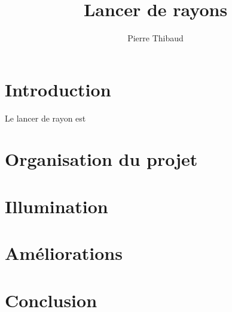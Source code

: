 \documentclass[10pt,a4paper]{article}
\author{Pierre \bsc{Donat-Bouillud} Thibaud \bsc{Ehret}}
\title{Lancer de rayons}
\begin{document}
\maketitle

\section*{Introduction} %
Le lancer de rayon est 
\section{Organisation du projet} %



\section{Illumination} %


\section{Améliorations} %



\section*{Conclusion}


\tableofcontents

\appendix %
\end{document}
